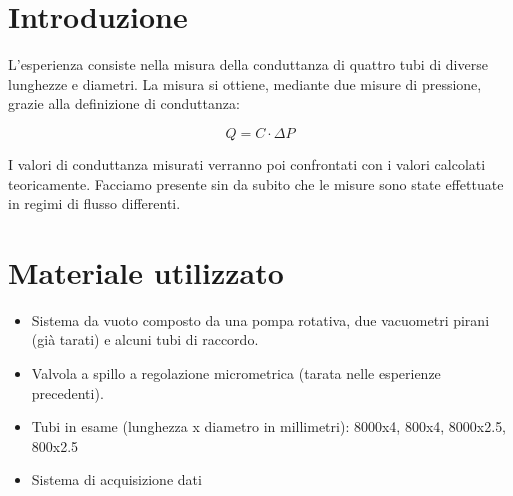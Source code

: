 \section{Introduzione}

L'esperienza consiste nella misura della conduttanza di quattro tubi di diverse lunghezze e diametri.
La misura si ottiene, mediante due misure di pressione, grazie alla definizione di conduttanza:

\begin{equation}
    Q = C \cdot \Delta P
\end{equation}

I valori di conduttanza misurati verranno poi confrontati con i valori calcolati teoricamente.
Facciamo presente sin da subito che le misure sono state effettuate in regimi di flusso
differenti.

\section{Materiale utilizzato}

\begin{itemize}
    \item{Sistema da vuoto composto da una pompa rotativa, due vacuometri pirani (già tarati) e alcuni tubi di raccordo.}
    \item{Valvola a spillo a regolazione micrometrica (tarata nelle esperienze precedenti).}
    \item{Tubi in esame (lunghezza x diametro in millimetri): 8000x4, 800x4, 8000x2.5, 800x2.5}
    \item{Sistema di acquisizione dati}
\end{itemize}
